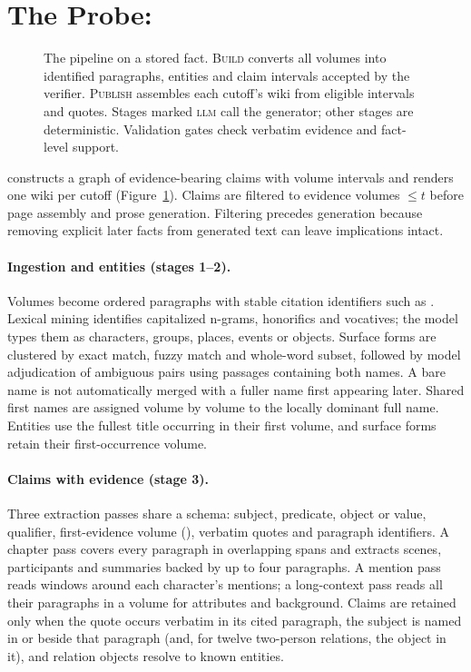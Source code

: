 \section{The Probe: \sys}
\label{sec:method}

\begin{figure}[t]
\centering
\resizebox{\textwidth}{!}{}
\caption{The \sys pipeline on a stored fact. \textsc{Build} converts all volumes into
identified paragraphs, entities and claim intervals accepted by the verifier. \textsc{Publish} assembles
each cutoff's wiki from eligible intervals and quotes. Stages marked \textsc{llm} call the
generator; other stages are deterministic. Validation gates check verbatim evidence and
fact-level support.}
\label{fig:pipeline}
\end{figure}

\sys constructs a graph of evidence-bearing claims with volume intervals and renders one
wiki per cutoff (Figure~\ref{fig:pipeline}). Claims are filtered to evidence volumes $\le t$
before page assembly and prose generation. Filtering precedes generation because removing
explicit later facts from generated text can leave implications intact.

\paragraph{Ingestion and entities (stages 1--2).}
Volumes become ordered paragraphs with stable citation identifiers such as
. Lexical mining identifies capitalized n-grams, honorifics and vocatives;
the model types them as characters, groups, places, events or objects. Surface forms are
clustered by exact match, fuzzy match and whole-word subset, followed by model adjudication
of ambiguous pairs using passages containing both names. A bare name is not automatically
merged with a fuller name first appearing later. Shared first names are assigned
volume by volume to the locally dominant full name. Entities use the fullest title occurring
in their first volume, and surface forms retain their first-occurrence volume.

\paragraph{Claims with evidence (stage 3).}
Three extraction passes share a schema: subject, predicate, object or value, qualifier,
first-evidence volume (\firstvol), verbatim quotes and paragraph identifiers.
A chapter pass covers every paragraph in overlapping spans and extracts scenes, participants
and summaries backed by up to four paragraphs. A mention pass reads windows around each
character's mentions; a long-context pass reads all their paragraphs in a volume for
attributes and background. Claims are retained only when the quote occurs verbatim in its
cited paragraph, the subject is named in or beside that paragraph (and, for twelve
two-person relations, the object in it), and relation objects resolve to known entities.

